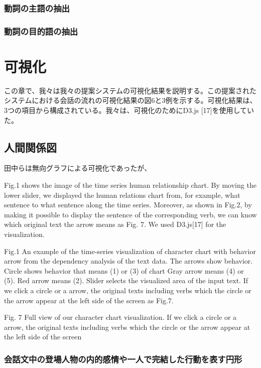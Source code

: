 \documentclass[shuuron]{kuee}
\begin{document}
\subsubsection{動詞の主語の抽出}
\subsubsection{動詞の目的語の抽出}



\section{可視化}

この章で、我々は我々の提案システムの可視化結果を説明する。この提案されたシステムにおける会話の流れの可視化結果の図6と3例を示する。可視化結果は、3つの項目から構成されている。我々は、可視化のためにD3.js [17]を使用していた。%



\subsection{人間関係図}

田中らは無向グラフによる可視化であったが、

  Fig.1 shows the image of the time series human relationship chart. By moving the lower slider, we displayed the human relations chart from, for example, what sentence to what sentence along the time series. Moreover, as shown in Fig.2, by making it possible to display the sentence of the corresponding verb, we can know which original text the arrow means as Fig. 7. We used D3.js[17] for the visualization.


Fig.1 An example of the time-series visualization of character chart with behavior arrow from the dependency analysis of the text data. The arrows show behavior. Circle shows behavior that means (1) or (3) of chart Gray arrow means (4) or (5). Red arrow means (2). Slider selects the visualized area of the input text. If we click a circle or a arrow, the original texts including verbs which the circle or the arrow appear at the left side of the screen as Fig.7.

Fig. 7 Full view of our character chart visualization. If we click a circle or a arrow, the original texts including verbs which the circle or the arrow appear at the left side of the screen

\subsubsection{会話文中の登場人物の内的感情や一人で完結した行動を表す円形}
\end{document}
